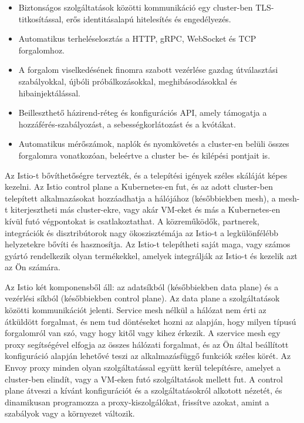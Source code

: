 \begin{itemize}
    \item Biztonságos szolgáltatások közötti kommunikáció egy cluster-ben TLS-titkosítással, erős identitásalapú hitelesítés és engedélyezés.
    \item Automatikus terheléselosztás a HTTP, gRPC, WebSocket és TCP forgalomhoz.
    \item A forgalom viselkedésének finomra szabott vezérlése gazdag útválasztási szabályokkal, újbóli próbálkozásokkal, meghibásodásokkal és hibainjektálással.
    \item Beilleszthető házirend-réteg és konfigurációs API, amely támogatja a hozzáférés-szabályozást, a sebességkorlátozást és a kvótákat.
    \item Automatikus mérőszámok, naplók és nyomkövetés a cluster-en belüli összes forgalomra vonatkozóan, beleértve a cluster be- és kilépési pontjait is.
\end{itemize}

Az Istio-t bővíthetőségre tervezték, és a telepítési igények széles skáláját képes kezelni. Az Istio control plane a Kubernetes-en fut, és az adott cluster-ben telepített alkalmazásokat hozzáadhatja a hálójához (későbbiekben mesh), a mesh-t kiterjesztheti más cluster-ekre, vagy akár VM-eket és más a Kubernetes-en kívül futó végpontokat is csatlakoztathat. A közreműködők, partnerek, integrációk és disztribútorok nagy ökoszisztémája az Istio-t a legkülönfélébb helyzetekre bővíti és hasznosítja. Az Istio-t telepítheti saját maga, vagy számos gyártó rendelkezik olyan termékekkel, amelyek integrálják az Istio-t és kezelik azt az Ön számára.

Az Istio két komponensből áll: az adatsíkból (későbbiekben data plane) és a vezérlési síkból (későbbiekben control plane).
Az data plane a szolgáltatások közötti kommunikációt jelenti. Service mesh nélkül a hálózat nem érti az átküldött forgalmat, és nem tud döntéseket hozni az alapján, hogy milyen típusú forgalomról van szó, vagy hogy kitől vagy kihez érkezik. A szervice mesh egy proxy segítségével elfogja az összes hálózati forgalmat, és az Ön által beállított konfiguráció alapján lehetővé teszi az alkalmazásfüggő funkciók széles körét. Az Envoy proxy minden olyan szolgáltatással együtt kerül telepítésre, amelyet a cluster-ben elindít, vagy a VM-eken futó szolgáltatások mellett fut. A control plane átveszi a kívánt konfigurációt és a szolgáltatásokról alkotott nézetét, és dinamikusan programozza a proxy-kiszolgálókat, frissítve azokat, amint a szabályok vagy a környezet változik.
\cite{istioSM}

